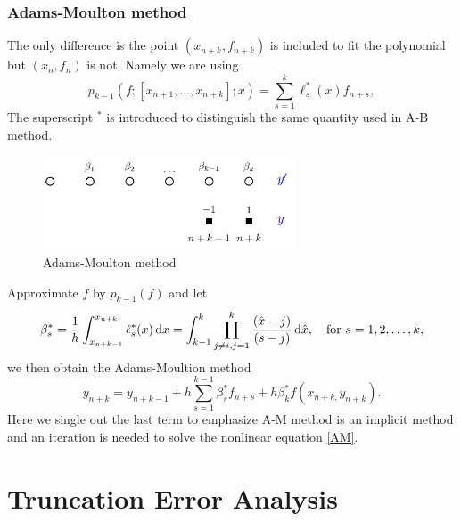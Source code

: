 \documentclass[10pt]{amsart}
\begin{document}
\subsubsection{Adams-Moulton method}
The only difference is the point $(x_{n+k}, f_{n+k})$ is included to fit the polynomial but $(x_n, f_n)$ is not. Namely we are using 
$$
p_{k-1}(f; [x_{n+1}, \ldots, x_{n+k}]; x) = \sum_{s=1}^{k}\ell_s^*(x) f_{n+s},
$$
The superscript $^*$ is introduced to distinguish the same quantity used in A-B method.

\begin{figure}[htbp]
\begin{center}
\includegraphics[width=7.5cm]{figures/AMmethod.pdf}
\caption{Adams-Moulton method}
\label{fig:multistep}
\end{center}
\end{figure}

%

Approximate $f$ by $p_{k-1}(f)$ and let 
$$
\beta_s^* = \frac{1}{h}\int_{x_{n+k-1}}^{x_{n+k}} \ell_s^*(x) \,{\rm d}x = \int_{k-1}^k\prod_{j\neq i, j=1}^{k} \frac{ (\hat x -j)}{(s - j)}\,{\rm d} \hat x, \quad \text{for } s =1, 2, \ldots, k, 
$$ we then obtain the Adams-Moultion method
\begin{equation}\label{AM}
y_{n+k} = y_{n+k-1} + h \sum_{s=1}^{k-1}\beta_s^* f_{n+s} + h\beta_k^*f(x_{n+k,} y_{n+k}).
\end{equation}
Here we single out the last term to emphasize A-M method is an implicit method and an iteration is needed to solve the nonlinear equation \eqref{AM}. 


\section{Truncation Error Analysis}
\end{document}
